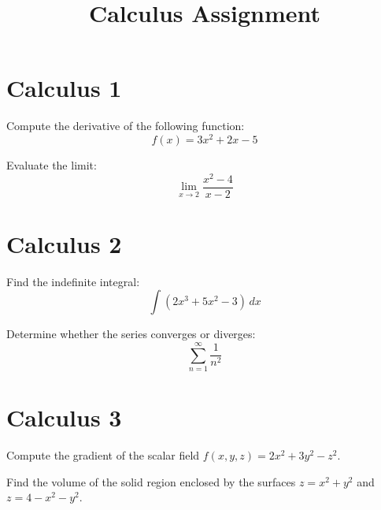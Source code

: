 \documentclass[noauthor,nooutcomes,12pt]{ximera}
\title{Calculus Assignment}
\begin{document}
\begin{abstract}
\end{abstract}
\maketitle


\section*{Calculus 1}

\begin{problem}
    Compute the derivative of the following function:
    \[
    f(x) = 3x^2 + 2x - 5
    \]
\end{problem}

\begin{problem}
    Evaluate the limit:
    \[
    \lim_{{x \to 2}} \frac{{x^2 - 4}}{{x - 2}}
    \]
\end{problem}

\section*{Calculus 2}

\begin{problem}
    Find the indefinite integral:
    \[
    \int (2x^3 + 5x^2 - 3) \,dx
    \]
\end{problem}

\begin{problem}
    Determine whether the series converges or diverges:
    \[
    \sum_{n=1}^{\infty} \frac{1}{n^2}
    \]
\end{problem}

\section*{Calculus 3}

\begin{problem}
    Compute the gradient of the scalar field $f(x, y, z) = 2x^2 + 3y^2 - z^2$.
\end{problem}

\begin{problem}
    Find the volume of the solid region enclosed by the surfaces $z = x^2 + y^2$ and $z = 4 - x^2 - y^2$.
\end{problem}
\end{document}
